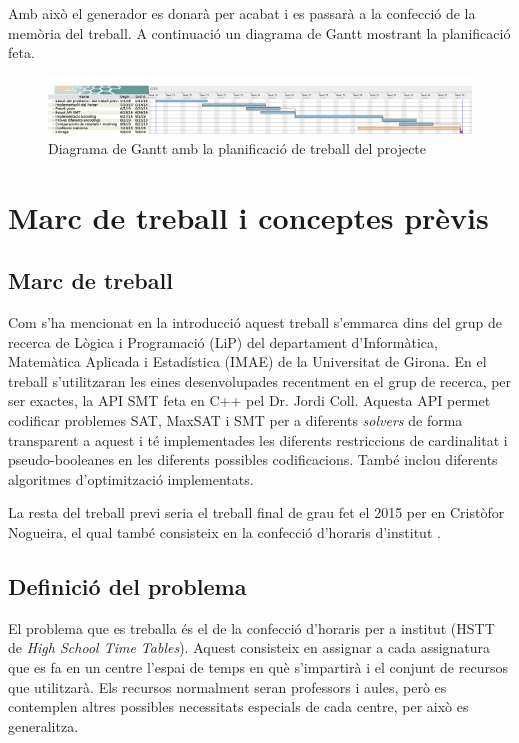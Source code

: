 \documentclass[11pt,a4paper,twoside]{report}
\begin{document}
  Amb això el generador es donarà per acabat i es passarà a la confecció de la memòria del treball. 
  A continuació un diagrama de Gantt mostrant la planificació feta.



  \begin{figure}
    \centering
    \includegraphics[angle=90,origin=c,height=0.58\textheight]{Diagrames/gantt1.png} 
    \caption{Diagrama de Gantt amb la planificació de treball del projecte}
    \label{fig:Gantt}
  \end{figure}




  \chapter{Marc de treball i conceptes prèvis}
  \section{Marc de treball}
    Com s'ha mencionat en la introducció aquest treball s'emmarca dins del grup de recerca de Lògica i Programació (LiP) del departament d'Informàtica, Matemàtica Aplicada i Estadística (IMAE) de la Universitat de Girona. 
    En el treball s'utilitzaran les eines desenvolupades recentment en el grup de recerca, per ser exactes, la API SMT feta en C++ pel Dr. Jordi Coll. 
    Aquesta API permet codificar problemes SAT, MaxSAT i SMT per a diferents \textit{solvers} de forma transparent a aquest i té implementades les diferents restriccions de cardinalitat i pseudo-booleanes en les diferents possibles codificacions. 
    També inclou diferents algoritmes d'optimització implementats.

    La resta del treball previ seria el treball final de grau fet el 2015 per en Cristòfor Nogueira, el qual també consisteix en la confecció d'horaris d'institut \cite{treballCristo}.

  \section{Definició del problema}
    El problema que es treballa és el de la confecció d'horaris per a institut (HSTT de \textit{High School Time Tables}). 
    Aquest consisteix en assignar a cada assignatura que es fa en un centre l'espai de temps en què s'impartirà i el conjunt de recursos que utilitzarà. 
    Els recursos normalment seran professors i aules, però es contemplen altres possibles necessitats especials de cada centre, per això es generalitza.
\end{document}
